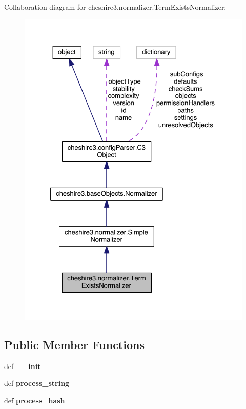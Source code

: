 Collaboration diagram for cheshire3.\-normalizer.\-Term\-Exists\-Normalizer\-:
\nopagebreak
\begin{figure}[H]
\begin{center}
\leavevmode
\includegraphics[width=328pt]{classcheshire3_1_1normalizer_1_1_term_exists_normalizer__coll__graph}
\end{center}
\end{figure}
\subsection*{Public Member Functions}
\begin{DoxyCompactItemize}
\item 
\hypertarget{classcheshire3_1_1normalizer_1_1_term_exists_normalizer_ae4082984d0fa693e476f4c7ec576e0a8}{def {\bfseries \-\_\-\-\_\-init\-\_\-\-\_\-}}\label{classcheshire3_1_1normalizer_1_1_term_exists_normalizer_ae4082984d0fa693e476f4c7ec576e0a8}

\item 
\hypertarget{classcheshire3_1_1normalizer_1_1_term_exists_normalizer_a0ad12c8c9c2517e2615632d9e8463187}{def {\bfseries process\-\_\-string}}\label{classcheshire3_1_1normalizer_1_1_term_exists_normalizer_a0ad12c8c9c2517e2615632d9e8463187}

\item 
\hypertarget{classcheshire3_1_1normalizer_1_1_term_exists_normalizer_a9fe3b143a2dd37f541c73a33fe133a8d}{def {\bfseries process\-\_\-hash}}\label{classcheshire3_1_1normalizer_1_1_term_exists_normalizer_a9fe3b143a2dd37f541c73a33fe133a8d}

\end{DoxyCompactItemize}
